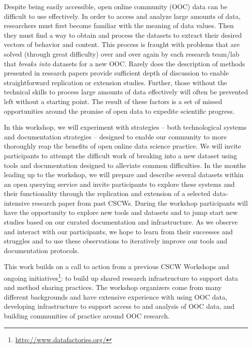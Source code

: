 Despite being easily accessible, open online community (OOC) data can be difficult to use effectively.  In order to access and analyze large amounts of data, researchers must first become familiar with the meaning of data values.  Then they must find a way to obtain and process the datasets to extract their desired vectors of behavior and content.  This process is fraught with problems that are solved (through great difficulty) over and over again by each research team/lab that \emph{breaks into} datasets for a new OOC.  Rarely does the description of methods presented in research papers provide sufficient depth of discussion to enable straightforward replication or extension studies.  Further, those without the technical skills to process large amounts of data effectively will often be prevented left without a starting point.  The result of these factors is a set of missed opportunities around the promise of open data to expedite scientific progress.

In this workshop, we will experiment with strategies -- both technological systems and documentation strategies -- designed to enable our community to more thoroughly reap the benefits of open online data science practice.  We will invite participants to attempt the difficult work of breaking into a new dataset using tools and documentation designed to alleviate common difficulties.  In the months leading up to the workshop, we will prepare and describe several datasets within an open querying service and invite participants to explore these systems and their functionality through the replication and extension of a selected data-intensive research paper from past CSCWs.  During the workshop participants will have the opportunity to explore new tools and datasets and to jump start new studies based on our curated documentation and infrastructure. As we observe and interact with our participants, we hope to learn from their successes and struggles and to use these observations to iteratively improve our tools and documentation protocols.

This work builds on a call to action from a previous CSCW Workshops\cite{goggins14ocdata, morgan15advancing} and ongoing initiatives\footnote{\url{http://www.datafactories.org/}}: to build up shared research infrastructure\cite{wiggins14quality, morgan15advancing_report} to support data and method sharing practices. The workshop organizers come from many different backgrounds and have extensive experience with using OOC data, developing infrastructure to support access to and analysis of OOC data, and building communities of practice around OOC research.

